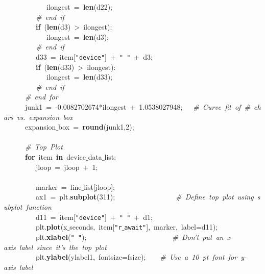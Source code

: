 \mbox{}\ \ \ \ \ \ \ \ \ \ \ \ ilongest\ =\ \textbf{len}(d22); \\
\mbox{}\ \ \ \ \ \ \ \ \ \textit{\#\ end\ if} \\
\mbox{}\ \ \ \ \ \ \ \ \ \textbf{if}\ (\textbf{len}(d3)\ \textgreater{}\ ilongest): \\
\mbox{}\ \ \ \ \ \ \ \ \ \ \ \ ilongest\ =\ \textbf{len}(d3); \\
\mbox{}\ \ \ \ \ \ \ \ \ \textit{\#\ end\ if} \\
\mbox{}\ \ \ \ \ \ \ \ \ d33\ =\ item[\texttt{"{}device"{}}]\ +\ \texttt{"{}\ "{}}\ +\ d3; \\
\mbox{}\ \ \ \ \ \ \ \ \ \textbf{if}\ (\textbf{len}(d33)\ \textgreater{}\ ilongest): \\
\mbox{}\ \ \ \ \ \ \ \ \ \ \ \ ilongest\ =\ \textbf{len}(d33); \\
\mbox{}\ \ \ \ \ \ \ \ \ \textit{\#\ end\ if} \\
\mbox{}\ \ \ \ \ \ \textit{\#\ end\ for} \\
\mbox{}\ \ \ \ \ \ junk1\ =\ -0.0082702674*ilongest\ +\ 1.0538027948;\ \ \ \textit{\#\ Curve\ fit\ of\ \#\ chars\ vs.\ expansion\ box} \\
\mbox{}\ \ \ \ \ \ expansion$\_$box\ =\ \textbf{round}(junk1,2); \\
\mbox{}\ \ \ \ \ \  \\
\mbox{}\ \ \ \ \ \ \textit{\#\ Top\ Plot} \\
\mbox{}\ \ \ \ \ \ \textbf{for}\ item\ \textbf{in}\ device$\_$data$\_$list: \\
\mbox{}\ \ \ \ \ \ \ \ \ jloop\ =\ jloop\ +\ 1; \\
\mbox{}\ \ \ \ \ \ \ \ \  \\
\mbox{}\ \ \ \ \ \ \ \ \ marker\ =\ line$\_$list[jloop]; \\
\mbox{}\ \ \ \ \ \ \ \ \ ax1\ =\ plt.\textbf{subplot}(311);\ \ \ \ \ \ \ \ \ \ \ \ \ \ \ \ \ \textit{\#\ Define\ top\ plot\ using\ subplot\ function} \\
\mbox{}\ \ \ \ \ \ \ \ \ d11\ =\ item[\texttt{"{}device"{}}]\ +\ \texttt{"{}\ "{}}\ +\ d1; \\
\mbox{}\ \ \ \ \ \ \ \ \ plt.\textbf{plot}(x$\_$seconds,\ item[\texttt{"{}r$\_$await"{}}],\ marker,\ label=d11); \\
\mbox{}\ \ \ \ \ \ \ \ \ plt.\textbf{xlabel}(\texttt{"{}\ "{}});\ \ \ \ \ \ \ \ \ \ \ \ \ \ \ \ \ \ \ \ \ \ \ \ \textit{\#\ Don't\ put\ an\ x-axis\ label\ since\ it's\ the\ top\ plot} \\
\mbox{}\ \ \ \ \ \ \ \ \ plt.\textbf{ylabel}(ylabel1,\ fontsize=fsize);\ \ \ \ \textit{\#\ Use\ a\ 10\ pt\ font\ for\ y-axis\ label} \\
